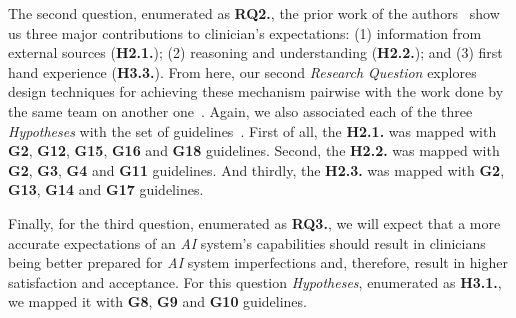 The second question, enumerated as {\bf RQ2.}, the prior work of the authors~\cite{kocielnik2019will} show us three major contributions to clinician's expectations: (1) information from external sources ({\bf H2.1.}); (2) reasoning and understanding ({\bf H2.2.}); and (3) first hand experience ({\bf H3.3.}). From here, our second {\it Research Question} explores design techniques for achieving these mechanism pairwise with the work done by the same team on another one~\cite{amershi2019guidelines}. Again, we also associated each of the three {\it Hypotheses} with the set of guidelines~\cite{amershi2019guidelines}. First of all, the {\bf H2.1.} was mapped with {\bf G2}, {\bf G12}, {\bf G15}, {\bf G16} and {\bf G18} guidelines. Second, the {\bf H2.2.} was mapped with {\bf G2}, {\bf G3}, {\bf G4} and {\bf G11} guidelines. And thirdly, the {\bf H2.3.} was mapped with {\bf G2}, {\bf G13}, {\bf G14} and {\bf G17} guidelines.

\clearpage

Finally, for the third question, enumerated as {\bf RQ3.}, we will expect that a more accurate expectations of an {\it AI} system's capabilities should result in clinicians being better prepared for {\it AI} system imperfections and, therefore, result in higher satisfaction and acceptance. For this question {\it Hypotheses}, enumerated as {\bf H3.1.}, we mapped it with {\bf G8}, {\bf G9} and {\bf G10} guidelines.

